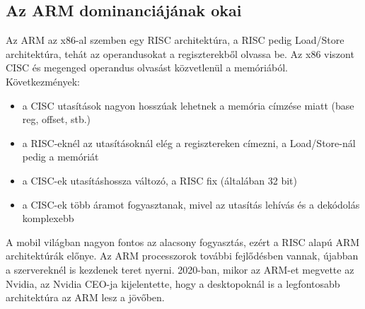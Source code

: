 \subsection{Az ARM dominanciájának okai}
Az ARM az x86-al szemben egy RISC architektúra, a RISC pedig Load/Store architektúra, tehát az operandusokat a regiszterekből olvassa be.
Az x86 viszont CISC és megenged operandus olvasást közvetlenül a memóriából.
Következmények:
\begin{itemize}
    \item a CISC utasítások nagyon hosszúak lehetnek a memória címzése miatt (base reg, offset, stb.)
    \item a RISC-eknél az utasításoknál elég a regisztereken címezni, a Load/Store-nál pedig a memóriát
    \item a CISC-ek utasításhossza változó, a RISC fix (általában 32 bit)
    \item a CISC-ek több áramot fogyasztanak, mivel az utasítás lehívás és a dekódolás komplexebb
\end{itemize}
A mobil világban nagyon fontos az alacsony fogyasztás, ezért a RISC alapú ARM architektúrák előnye.
Az ARM processzorok további fejlődésben vannak, újabban a szervereknél is kezdenek teret nyerni.
2020-ban, mikor az ARM-et megvette az Nvidia, az Nvidia CEO-ja kijelentette, hogy a desktopoknál is a legfontosabb architektúra az ARM lesz a jövőben.

